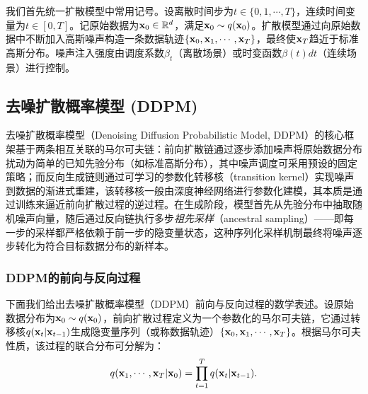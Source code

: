 \documentclass[11pt,a4paper,UTF8]{ctexart}
\begin{document}
我们首先统一扩散模型中常用记号。设离散时间步为$t\in\{0,1,\cdots,T\}$，连续时间变量为$t\in[0,T]$。记原始数据为$\mathbf{x}_0\in\mathbb{R}^d$，满足$\mathbf{x}_0\sim q(\mathbf{x}_0)$。扩散模型通过向原始数据中不断加入高斯噪声构造一条数据轨迹$\{\mathbf{x}_0,\mathbf{x}_1,\cdots,\mathbf{x}_T\}$，最终使$\mathbf{x}_T$趋近于标准高斯分布。噪声注入强度由调度系数$\beta_t$（离散场景）或时变函数$\beta(t)dt$（连续场景）进行控制。


\subsection{去噪扩散概率模型 (DDPM)}

去噪扩散概率模型（Denoising Diffusion Probabilistic Model, DDPM）的核心框架基于两条相互关联的马尔可夫链：前向扩散链通过逐步添加噪声将原始数据分布扰动为简单的已知先验分布（如标准高斯分布），其中噪声调度可采用预设的固定策略；而反向生成链则通过可学习的参数化转移核（transition kernel）实现噪声到数据的渐进式重建，该转移核一般由深度神经网络进行参数化建模，其本质是通过训练来逼近前向扩散过程的逆过程。在生成阶段，模型首先从先验分布中抽取随机噪声向量，随后通过反向链执行多步\emph{祖先采样}（ancestral sampling）\cite{koller2009probabilistic}——即每一步的采样都严格依赖于前一步的隐变量状态，这种序列化采样机制最终将噪声逐步转化为符合目标数据分布的新样本。

\subsubsection{DDPM的前向与反向过程}

下面我们给出去噪扩散概率模型（DDPM）前向与反向过程的数学表述。设原始数据分布为$\mathbf{x}_0\sim q(\mathbf{x}_0)$，前向扩散过程定义为一个参数化的马尔可夫链，它通过转移核$q(\mathbf{x}_t|\mathbf{x}_{t-1})$生成隐变量序列（或称数据轨迹）$\{\mathbf{x}_0,\mathbf{x}_1,\cdots,\mathbf{x}_T\}$。根据马尔可夫性质，该过程的联合分布可分解为：
\begin{equation*}
    q(\mathbf{x}_1,\cdots,\mathbf{x}_T|\mathbf{x}_0)=\prod_{t=1}^T q(\mathbf{x}_t|\mathbf{x}_{t-1}).
\end{equation*}
\end{document}
